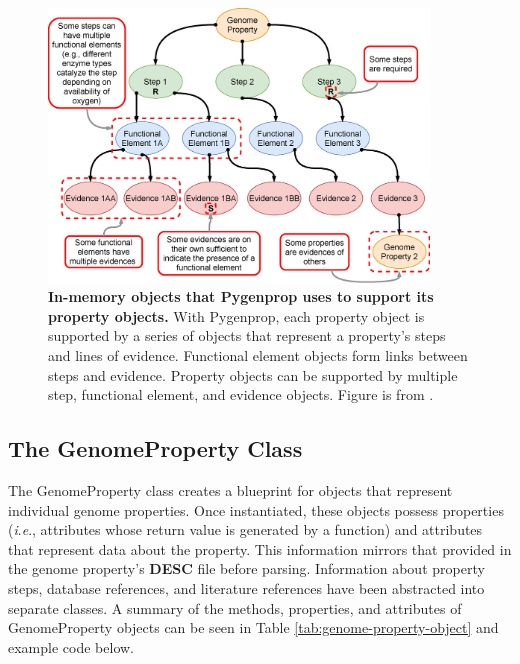 \begin{figure}[!ht]
  \centering
	\includegraphics[width=0.90\textwidth]{media/Figure_1B.eps}
	 	 \caption[In-memory objects that Pygenprop uses to support its property 
objects.]{\textbf{In-memory objects that Pygenprop uses to support its property 
objects.} With Pygenprop, each property object is supported by a series of 
objects that represent a property's steps and lines of evidence. Functional 
element objects form links between steps and evidence. Property objects can be 
supported by multiple step, functional element, and evidence objects. Figure is 
from \cite{bergstrand2019pygenprop}.}
	 \label{fig:property}
\end{figure}


\subsection{The GenomeProperty Class} \label{genome-property-class}

The GenomeProperty class creates a blueprint for objects that represent 
individual genome properties. Once instantiated, these objects possess 
properties (\textit{i}.\textit{e}., attributes whose return value is generated by a function) and 
attributes that represent data about the property. This information mirrors that 
provided in the genome property's \textbf{DESC} file before parsing. Information 
about property steps, database references, and literature references have been 
abstracted into separate classes. A summary of the methods, properties, and 
attributes of GenomeProperty objects can be seen in Table 
\ref{tab:genome-property-object} and example code below.

